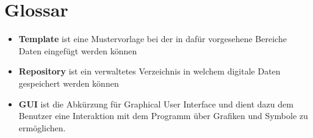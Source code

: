 
\section{Glossar}


\begin{itemize}
	\item \textbf{Template} ist eine Mustervorlage bei der in dafür vorgesehene Bereiche Daten eingefügt werden können
	\item \textbf{Repository} ist ein verwaltetes Verzeichnis in welchem digitale Daten gespeichert werden können
	\item \textbf{GUI} ist die Abkürzung für Graphical User Interface und dient dazu dem Benutzer eine Interaktion mit dem Programm über Grafiken und Symbole zu ermöglichen.
\end{itemize}

